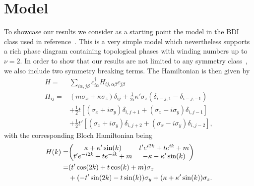 \documentclass[twocolumn,amsmath,longbibliography,amssymb,superscriptaddress]{revtex4-1}
\begin{document}
\section{Model}
To showcase our results we consider as a starting point the model in the BDI class used in reference~\cite{Song2014}. 
This is a very simple model which nevertheless supports a rich phase diagram containing topological phases with winding numbers up to $\nu =2$. 
In order to show that our results are not limited to any symmetry class~\cite{ryu2010topological}, we also include two symmetry breaking terms. 
The Hamiltonian is then given by
\begin{align}
H =& \sum_{i\alpha,j\beta} c_{i\alpha}^\dagger H_{ij,\alpha \beta} c_{j\beta} \\
H_{ij} =& (m \sigma_x + \kappa \sigma_z)\delta_{ij}  + \frac{1}{2i}\kappa'\sigma_z (\delta_{i-j,1}-\delta_{i-j,-1})\nonumber\\
&+ \frac{1}{2} t \left[(\sigma_x + i \sigma_y)\delta_{i,j+1} + (\sigma_x - i \sigma_y) \delta_{i,j-1} \right] \nonumber\\
&+  \frac{1}{2} t' \left[(\sigma_x + i \sigma_y)\delta_{i,j+2} + (\sigma_x - i \sigma_y) \delta_{i,j-2} \right],
\label{bdi_model}
\end{align}
with the corresponding Bloch Hamiltonian being
\begin{align}
H(k)=&\mqty( \kappa + \kappa' \sin(k) & t' e^{i2k} + t e^{ik}+m \nonumber\\t' e^{-i2k} + t e^{-ik}+m & -\kappa-\kappa' \sin(k)  )\nonumber \\
=& (t' \cos(2k)+t\cos(k)+m)\sigma_x \\
&+ (-t' \sin(2k)-t\sin(k))\sigma_y + (\kappa+\kappa'\sin(k)) \sigma_z.\nonumber
\end{align}
\end{document}

